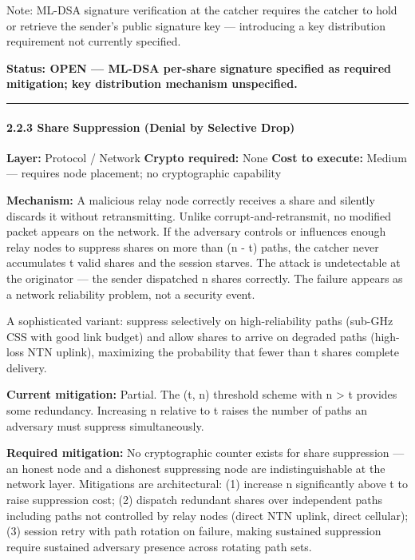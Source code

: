 \documentclass[
  11pt,
]{article}
\begin{document}
Note: ML-DSA signature verification at the catcher requires the catcher
to hold or retrieve the sender's public signature key --- introducing a
key distribution requirement not currently specified.

\textbf{Status: OPEN --- ML-DSA per-share signature specified as
required mitigation; key distribution mechanism unspecified.}

\begin{center}\rule{0.5\linewidth}{0.5pt}\end{center}

\hypertarget{share-suppression-denial-by-selective-drop}{%
\paragraph{2.2.3 Share Suppression (Denial by Selective
Drop)}\label{share-suppression-denial-by-selective-drop}}

\textbf{Layer:} Protocol / Network \textbf{Crypto required:} None
\textbf{Cost to execute:} Medium --- requires node placement; no
cryptographic capability

\textbf{Mechanism:} A malicious relay node correctly receives a share
and silently discards it without retransmitting. Unlike
corrupt-and-retransmit, no modified packet appears on the network. If
the adversary controls or influences enough relay nodes to suppress
shares on more than (n - t) paths, the catcher never accumulates t valid
shares and the session starves. The attack is undetectable at the
originator --- the sender dispatched n shares correctly. The failure
appears as a network reliability problem, not a security event.

A sophisticated variant: suppress selectively on high-reliability paths
(sub-GHz CSS with good link budget) and allow shares to arrive on
degraded paths (high-loss NTN uplink), maximizing the probability that
fewer than t shares complete delivery.

\textbf{Current mitigation:} Partial. The (t, n) threshold scheme with n
\textgreater{} t provides some redundancy. Increasing n relative to t
raises the number of paths an adversary must suppress simultaneously.

\textbf{Required mitigation:} No cryptographic counter exists for share
suppression --- an honest node and a dishonest suppressing node are
indistinguishable at the network layer. Mitigations are architectural:
(1) increase n significantly above t to raise suppression cost; (2)
dispatch redundant shares over independent paths including paths not
controlled by relay nodes (direct NTN uplink, direct cellular); (3)
session retry with path rotation on failure, making sustained
suppression require sustained adversary presence across rotating path
sets.
\end{document}
